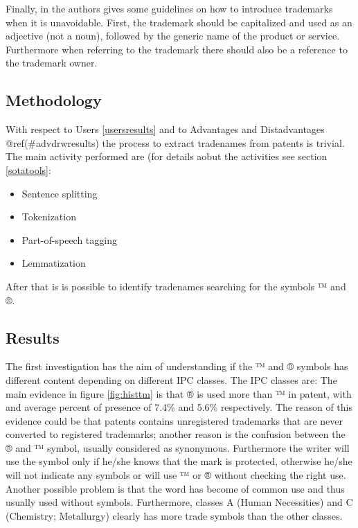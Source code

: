 \documentclass[]{book}
\providecommand{\tightlist}{%
  \setlength{\itemsep}{0pt}\setlength{\parskip}{0pt}}
\theoremstyle{definition}
\theoremstyle{definition}
\theoremstyle{definition}
\theoremstyle{remark}
\begin{document}
Finally, in \citep{pressman2018nolo} the authors gives some guidelines
on how to introduce trademarks when it is unavoidable. First, the
trademark should be capitalized and used as an adjective (not a noun),
followed by the generic name of the product or service. Furthermore when
referring to the trademark there should also be a reference to the
trademark owner.

\subsection{Methodology}\label{methodology-1}

With respect to Users \ref{usersresults} and to Advantages and
Distadvantages @ref(\#advdrwresults) the process to extract tradenames
from patents is trivial. The main activity performed are (for details
aobut the activities see section \ref{sotatools}:

\begin{itemize}
\tightlist
\item
  Sentence splitting
\item
  Tokenization
\item
  Part-of-speech tagging
\item
  Lemmatization
\end{itemize}

After that is is possible to identify tradenames searching for the
symbols ™ and ®.

\subsection{Results}\label{results-2}

The first investigation has the aim of understanding if the ™ and ®
symbols has different content depending on different IPC \citep{wipo1}
classes. The IPC classes are: The main evidence in figure
\ref{fig:histtm} is that ® is used more than ™ in patent, with and
average percent of presence of 7.4\% and 5.6\% respectively. The reason
of this evidence could be that patents contains unregistered trademarks
that are never converted to registered trademarks; another reason is the
confusion between the ® and ™ symbol, usually considered as synonymous.
Furthermore the writer will use the symbol only if he/she knows that the
mark is protected, otherwise he/she will not indicate any symbols or
will use ™ or ® without checking the right use. Another possible problem
is that the word has become of common use and thus usually used without
symbols. Furthermore, classes A (Human Necessities) and C (Chemistry;
Metallurgy) clearly has more trade symbols than the other classes.
\end{document}
